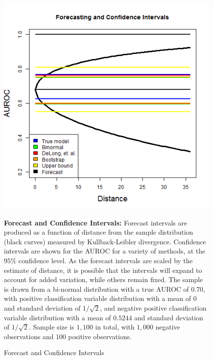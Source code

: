 


\begin{figure}[h!]

\begin{center}

    \caption{Forecast and Confidence Intervals} \label{fig:Forecast1}

        \includegraphics[scale=  0.75]{Figs/Forecast/Forecast_int_1.png}



\end{center}

    \footnotesize

        \textbf{Forecast and Confidence Intervals:}
        Forecast intervals are produced as a function of distance from the sample distribution (black curves) measured by Kullback-Leibler divergence.
        Confidence intervals are shown for the AUROC for a variety of methods, at the $95\%$ confidence level.
        As the forecast intervals are scaled by the estimate of distance, it is possible that the intervals will expand to account for added variation, while others remain fixed.
        The sample is drawn from a bi-normal distribution with a true AUROC of $0.70$, with positive classification variable distribution with a mean of $0$ and standard deviation of $1/\sqrt{2}$, and negative positive classification variable distribution with a mean of $0.5244$ and standard deviation of $1/\sqrt{2}$.
        Sample size is $1,100$ in total, with $1,000$ negative observations and $100$ positive observations.


\end{figure}
